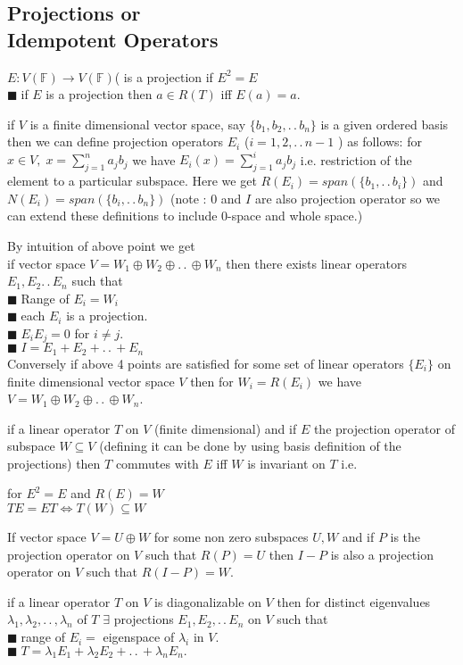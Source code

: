 \documentclass[11pt]{extarticle}
\newcommand{\F}{\mathbb{F}}
\newcommand{\ra}{\rightarrow}
\newcommand{\ck}{.\,.\,}
\newcommand{\snote}[1]{{\footnotesize(#1)}}
\newcommand{\tbx}[2][]{
	\begin{tcolorbox}[enhanced,breakable,size=small,colback=black!2!white,title={#1},arc is angular, arc=1.5mm,drop fuzzy shadow]
		#2
	\end{tcolorbox}
}
\newcommand{\yi}{\\$\blacksquare\;$}
\begin{document}
\begin{multicols}{2}
\section{Projections or \\ Idempotent Operators }
\tbx[Projections]{ $ E: V(\F)\ra V(\F) $( is a projection if $ E^2=E $ 
\yi if $ E $ is a projection then $ a\in R(T) $ iff $ E(a)=a. $  }
\tbx{ if $ V $ is a finite dimensional vector space, say $ \{b_1,b_2,\ck b_n\} $ is a given ordered basis then we can define projection operators $ E_i $ \snote{$ i=1,2,\ck n-1 $ } as follows: for $x\in V,\; x= \sum\limits_{j=1}^{n}a_jb_j $ we have 
 $ E_i(x)=\sum\limits_{j=1}^{i} a_jb_j$  i.e. restriction of the element to a particular subspace. Here we get $ R(E_i)=span(\{b_1,\ck b_i\}) $ and $ N(E_i) =span(\{b_i,\ck b_n\})$ \snote{note : $ 0 $ and $ I $ are also projection operator so we can extend these definitions to include 0-space and whole space.} }
 \tbx{ By intuition of above point we get \\
  if vector space $ V=W_1\oplus W_2 \oplus \ck \oplus W_n $ then there exists linear operators $ E_1,E_2\ck E_n $ such that
  \yi Range of $ E_i = W_i$ 
  \yi each $ E_i $ is a projection.
  \yi $ E_iE_j=0 $ for $ i\neq j. $ 
  \yi $ I=E_1+E_2+\ck +E_n $ \\
  Conversely if above 4 points are satisfied for some set of linear operators $ \{E_i\} $ on finite dimensional vector space $ V $ then for $ W_i=R(E_i) $ we have $ V= W_1\oplus W_2 \oplus \ck \oplus W_n$.}
  \tbx{ if a linear operator $ T $ on $ V $ \snote{finite dimensional} and if $ E $ the projection operator of subspace $ W\subseteq V $ \snote{defining it can be done by using basis definition of the projections}  then $ T $ commutes with $ E $ iff $ W$ is invariant on $ T $ i.e. 
  	 \begin{center}
  	 for $ E^2=E$ and  $ R(E)=W $\\
  $ TE=ET \iff T(W)\subseteq W $
  	 	\end{center} }
   	 \tbx{ If vector space $ V=U\oplus W$ for some non zero subspaces $ U,W $ and if $ P $ is the projection operator on $ V $ such that $ R(P)=U $ then $ I-P $ is also a projection operator on $ V $ such that $ R(I-P)=W .$   }
   	\tbx[Diagonalizability and Projections]{ if a linear operator $ T $ on $ V $  is diagonalizable on  $ V $ then for distinct eigenvalues $ \lambda_1,\lambda_2,\ck, \lambda_n$ of $ T $ $ \exists $ projections $ E_1,E_2,\ck E_n $ on $ V $ such that
   	\yi range of $ E_i = $ eigenspace of $ \lambda_i $ in $ V $.
   	\yi $ T=\lambda_1 E_1+\lambda_2 E_2 +\ck +\lambda_n E_n .$
}
\end{multicols}
\end{document}
